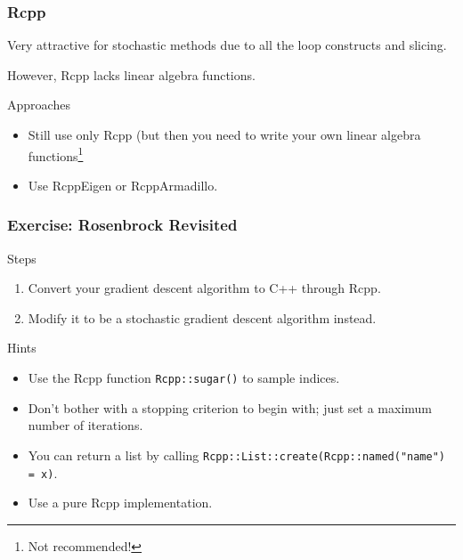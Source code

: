 \documentclass[aspectratio=1610,onlytextwidth]{beamer}
\begin{document}
\begin{frame}[c]
  \frametitle{Rcpp}

  Very attractive for stochastic methods due to all the loop constructs and slicing.

  \medskip

  However, Rcpp lacks linear algebra functions.

  \begin{block}{Approaches}
    \begin{itemize}
      \item Still use only Rcpp (but then you need to write your own linear algebra functions\footnote{Not recommended!}
      \item Use RcppEigen or RcppArmadillo.
    \end{itemize}
  \end{block}
\end{frame}

\begin{frame}[c]
  \frametitle{Exercise: Rosenbrock Revisited}

  \begin{block}{Steps}
    \begin{enumerate}
      \item Convert your gradient descent algorithm to C++ through Rcpp.
      \item Modify it to be a stochastic gradient descent algorithm instead.
    \end{enumerate}
  \end{block}

  \pause\bigskip

  \begin{block}{Hints}
    \begin{itemize}
      \item Use the Rcpp function \texttt{Rcpp::sugar()} to sample indices.
      \item Don't bother with a stopping criterion to begin with; just set a maximum number of
            iterations.
      \item You can return a list by calling \texttt{Rcpp::List::create(Rcpp::named("name") = x)}.
      \item Use a pure Rcpp implementation.
    \end{itemize}
  \end{block}

\end{frame}
\end{document}
